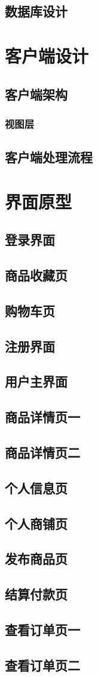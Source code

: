\documentclass[12pt]{ctexart} %
\begin{document}
\subsection{数据库设计}


\section{客户端设计}

\subsection{客户端架构}
\subsubsection{视图层}
\subsection{客户端处理流程}

\section{界面原型}


\subsection{登录界面}
\subsection{商品收藏页}
\subsection{购物车页}
\subsection{注册界面}
\subsection{用户主界面}
\subsection{商品详情页一}
\subsection{商品详情页二}
\subsection{个人信息页}
\subsection{个人商铺页}
\subsection{发布商品页}
\subsection{结算付款页}
\subsection{查看订单页一}
\subsection{查看订单页二}
\end{document}
